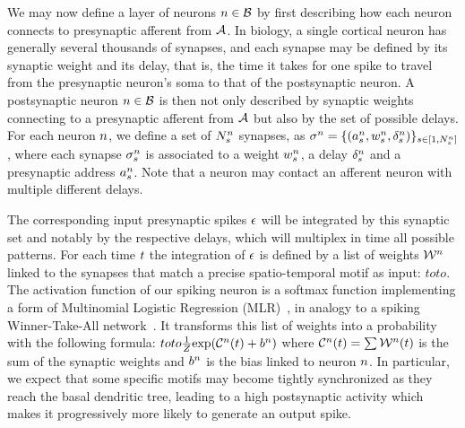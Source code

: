 \documentclass[default]{sn-jnl}%
\theoremstyle{thmstyleone}%
\theoremstyle{thmstyletwo}%
\theoremstyle{thmstylethree}%
\begin{document}
We may now define a layer of neurons $n \in \mathcal{B}$ by first describing how each neuron connects to presynaptic afferent from $\mathcal{A}$. In biology, a single cortical neuron has generally several thousands of synapses, and each synapse may be defined by its synaptic weight and its delay, that is, the time it takes for one spike to travel from the presynaptic neuron's soma to that of the postsynaptic neuron. A postsynaptic neuron $n \in \mathcal{B}$ is then not only described by synaptic weights connecting to a presynaptic afferent from $\mathcal{A}$ but also by the set of possible delays. For each neuron $n$, we define a set of $N_{s}^n$ synapses, as  $\sigma^n = \{(a^n_s, w^n_s, \delta^n_s)\}_{s \in [1,N_{s}^n]}$, where each synapse $\sigma^n_s$ is associated to a weight $w^n_s$, a delay $\delta^n_s$ and a presynaptic address $a^n_s$. Note that a neuron may contact an afferent neuron with multiple different delays.

The corresponding input presynaptic spikes $\epsilon$ will be integrated by this synaptic set and notably by the respective delays, which will multiplex in time all possible patterns.
For each time $t$ the integration of $\epsilon$ is defined by a list of weights $\mathcal{W}^n$ linked to the synapses that match a precise spatio-temporal motif as input:
$
toto
$.
%
The activation function of our spiking neuron is a softmax function implementing a form of  Multinomial Logistic Regression (MLR)~\cite{Grimaldi22pami}, in analogy to a spiking Winner-Take-All network~\cite{nessler2013bayesian}. It transforms this list of weights into a probability with the following formula:
$
toto
\frac 1 Z
{\exp  (\mathcal{C}^n(t) +b^n) }
$ 
where $\mathcal{C}^n(t) = \sum
\mathcal{W}^n(t)
$ is the sum of the synaptic weights and $b^n$ is the bias linked to neuron $n$. 
In particular, we expect that some specific motifs may become tightly synchronized as they reach the basal dendritic tree, leading to a high postsynaptic activity which makes it progressively more likely to generate an output spike.
%
\end{document}
